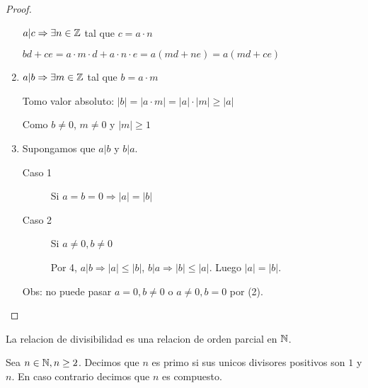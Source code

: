 \begin{proof}
\begin{enumerate}
		      \(a | c \Rightarrow \exists n \in \mathbb{Z} \) tal que \(c = a \cdot n \)
		      
		      \(bd + ce = a \cdot m \cdot d + a \cdot n \cdot e = a (md + ne) = a (md + ce )\)
		      
		\item \(a|b \Rightarrow \exists m \in \mathbb{Z} \) tal que \(b = a \cdot m \)
		      
		      Tomo valor absoluto: \(|b| = |a \cdot m| = |a| \cdot |m| \geq |a|\)
		      
		      Como \(b \neq 0\), \(m \neq 0 \) y \(|m| \geq  1	\)
		      
		\item Supongamos que \(a|b \) y \(b|a \).
		      \begin{description}
			      \item[Caso 1] Si \(a = b = 0 \Rightarrow |a| = |b|\)
			      \item[Caso 2] Si \(a \neq 0, b \neq 0\)
				      
				      Por 4, \(a|b \Rightarrow |a| \leq |b| \), \(b|a \Rightarrow |b| \leq |a| \). Luego \(|a| = |b|\).
				      
		      \end{description}
		      Obs: no puede pasar \(a = 0, b \neq 0 \) o \(a \neq 0, b = 0 \) por (2).
	\end{enumerate}
\end{proof}

\begin{corollary}
	La relacion de divisibilidad es una relacion de orden parcial en \(\mathbb{N} \).
\end{corollary}

\begin{definition}
	Sea \(n \in \mathbb{N}, n \geq  2 \). Decimos que \(n \) es primo si sus unicos divisores positivos son \(1 \) y \(n \). En caso contrario decimos que \(n \) es compuesto.
\end{definition}

